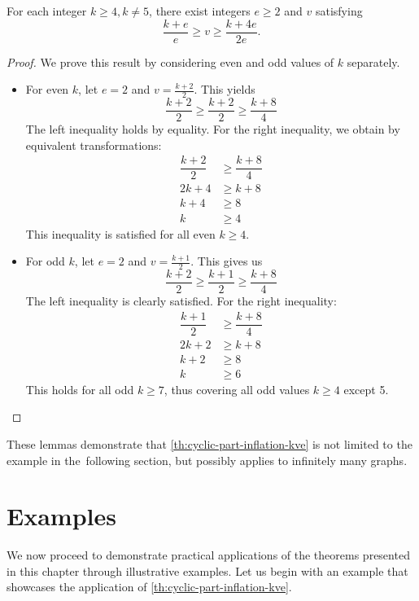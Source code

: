 \documentclass[12pt, twoside]{book}
\begin{document}
\begin{lemma}
	For each integer $k\geq 4, k\neq 5$, there exist integers $e\geq 2$ and $v$ satisfying
	$$\dfrac{k+e}{e}\geq v\geq \dfrac{k+4e}{2e}.$$
\end{lemma}

\begin{proof}
	We prove this result by considering even and odd values of $k$ separately.
	\begin{itemize}
		\item For even $k$, let $e=2$ and $v=\frac{k+2}{2}$. This yields
		$$\dfrac{k+2}{2}\geq \dfrac{k+2}{2}\geq \dfrac{k+8}{4}$$
		The left inequality holds by equality. For the right inequality, we obtain by equivalent transformations:
		\begin{align*}
			\dfrac{k+2}{2}&\geq \dfrac{k+8}{4} \\
			2k+4&\geq k+8 \\
			k+4&\geq 8 \\
			k&\geq 4
		\end{align*}
		This inequality is satisfied for all even $k\geq 4$.
		
		\item For odd $k$, let $e=2$ and $v=\frac{k+1}{2}$. This gives us
		$$\dfrac{k+2}{2}\geq \dfrac{k+1}{2}\geq \dfrac{k+8}{4}$$
		The left inequality is clearly satisfied. For the right inequality:
		\begin{align*}
			\dfrac{k+1}{2}&\geq \dfrac{k+8}{4} \\
			2k+2&\geq k+8 \\
			k+2&\geq 8 \\
			k&\geq 6
		\end{align*}
		This holds for all odd $k\geq 7$, thus covering all odd values $k\geq 4$ except 5.
	\end{itemize}
\end{proof}

These lemmas demonstrate that \cref{th:cyclic-part-inflation-kve} is not limited to the example in the~following section, but possibly applies to infinitely many graphs.

\section{Examples}

We now proceed to demonstrate practical applications of the theorems presented in this chapter through illustrative examples. Let us begin with an example that showcases the application of \cref{th:cyclic-part-inflation-kve}.
\end{document}

